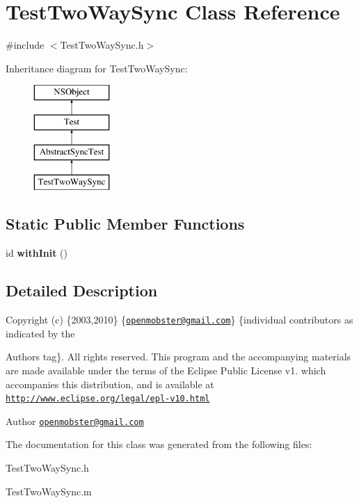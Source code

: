 \hypertarget{interface_test_two_way_sync}{
\section{\-Test\-Two\-Way\-Sync \-Class \-Reference}
\label{interface_test_two_way_sync}
}


{\ttfamily \#include $<$\-Test\-Two\-Way\-Sync.\-h$>$}

\-Inheritance diagram for \-Test\-Two\-Way\-Sync\-:\begin{figure}[H]
\begin{center}
\leavevmode
\includegraphics[height=4.000000cm]{interface_test_two_way_sync}
\end{center}
\end{figure}
\subsection*{\-Static \-Public \-Member \-Functions}
\begin{DoxyCompactItemize}
\item 
\hypertarget{interface_test_two_way_sync_a8ff5e2a2d71a53deafef537f0c044141}{
id {\bfseries with\-Init} ()}
\label{interface_test_two_way_sync_a8ff5e2a2d71a53deafef537f0c044141}

\end{DoxyCompactItemize}


\subsection{\-Detailed \-Description}
\-Copyright (c) \{2003,2010\} \{\href{mailto:openmobster@gmail.com}{\tt openmobster@gmail.\-com}\} \{individual contributors as indicated by the \begin{DoxyAuthor}{\-Authors}
tag\}. \-All rights reserved. \-This program and the accompanying materials are made available under the terms of the \-Eclipse \-Public \-License v1. which accompanies this distribution, and is available at \href{http://www.eclipse.org/legal/epl-v10.html}{\tt http\-://www.\-eclipse.\-org/legal/epl-\/v10.\-html}
\end{DoxyAuthor}
\begin{DoxyAuthor}{\-Author}
\href{mailto:openmobster@gmail.com}{\tt openmobster@gmail.\-com} 
\end{DoxyAuthor}


\-The documentation for this class was generated from the following files\-:\begin{DoxyCompactItemize}
\item 
\-Test\-Two\-Way\-Sync.\-h\item 
\-Test\-Two\-Way\-Sync.\-m\end{DoxyCompactItemize}

